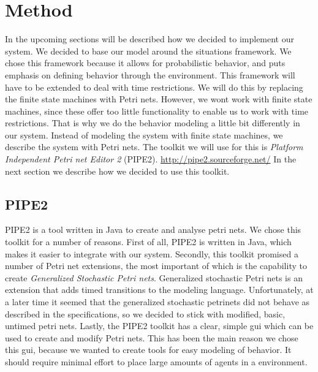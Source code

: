 \documentclass[11pt]{book}
\begin{document}
\chapter{Method}
In the upcoming sections will be described how we decided to implement our system. We decided to base our model around the situations framework. We chose this framework because it allows for probabilistic behavior, and puts emphasis on defining behavior through the environment. This framework will have to be extended to deal with time restrictions. We will do this by replacing the finite state machines with Petri nets. However, we wont work with finite state machines, since these offer too little functionality to enable us to work with time restrictions. That is why we do the behavior modeling a little bit differently in our system. Instead of modeling the system with finite state machines, we describe the system with Petri nets.  The toolkit we will use for this is \emph{Platform Independent Petri net Editor 2} (PIPE2). \url{http://pipe2.sourceforge.net/} In the next section we describe how we decided to use this toolkit.

\section{PIPE2}
PIPE2 is a tool written in Java to create and analyse petri nets. We chose this toolkit for a number of reasons. First of all, PIPE2 is written in Java, which makes it easier to integrate with our system. Secondly, this toolkit promised a number of Petri net extensions, the most important of which is the capability to create \emph{Generalized Stochastic Petri nets}. Generalized stochastic Petri nets is an extension that adds timed transitions to the modeling language.
Unfortunately, at a later time it seemed that the generalized stochastic petrinets did not behave as described in the specifications, so we decided to stick with modified, basic, untimed petri nets. Lastly, the PIPE2 toolkit has a clear, simple gui which can be used to create and modify Petri nets. This has been the main reason we chose this gui, because we wanted to create tools for easy modeling of behavior. It should require minimal effort to place large amounts of agents in a environment.
\end{document}
